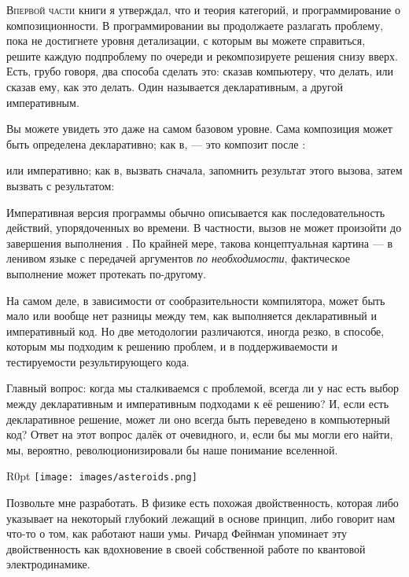 
\lettrine[lhang=0.17]{В}{первой части} книги я утверждал, что и теория категорий, и
программирование о композиционности. В программировании вы продолжаете
разлагать проблему, пока не достигнете уровня детализации, с которым вы можете
справиться, решите каждую подпроблему по очереди и рекомпозируете решения
снизу вверх. Есть, грубо говоря, два способа сделать это: сказав
компьютеру, что делать, или сказав ему, как это делать. Один называется
декларативным, а другой императивным.

Вы можете увидеть это даже на самом базовом уровне. Сама композиция может быть
определена декларативно; как в,  --- это композит 
после :

или императивно; как в, вызвать  сначала, запомнить результат
этого вызова, затем вызвать  с результатом:

Императивная версия программы обычно описывается как последовательность
действий, упорядоченных во времени. В частности, вызов  не может
произойти до завершения выполнения . По крайней мере, такова
концептуальная картина --- в ленивом языке с передачей аргументов
\emph{по необходимости}, фактическое выполнение может протекать по-другому.

На самом деле, в зависимости от сообразительности компилятора, может быть
мало или вообще нет разницы между тем, как выполняется декларативный и императивный код.
Но две методологии различаются, иногда резко, в
способе, которым мы подходим к решению проблем, и в поддерживаемости и
тестируемости результирующего кода.

Главный вопрос: когда мы сталкиваемся с проблемой, всегда ли у нас есть
выбор между декларативным и императивным подходами к её решению?
И, если есть декларативное решение, может ли оно всегда быть переведено
в компьютерный код? Ответ на этот вопрос далёк от очевидного, и,
если бы мы могли его найти, мы, вероятно, революционизировали бы наше понимание
вселенной.

\begin{wrapfigure}{R}{0pt}
  \texttt{[image: images/asteroids.png]}
\end{wrapfigure}

Позвольте мне разработать. В физике есть похожая двойственность, которая либо
указывает на некоторый глубокий лежащий в основе принцип, либо говорит нам что-то о
том, как работают наши умы. Ричард Фейнман упоминает эту двойственность как
вдохновение в своей собственной работе по квантовой электродинамике.


